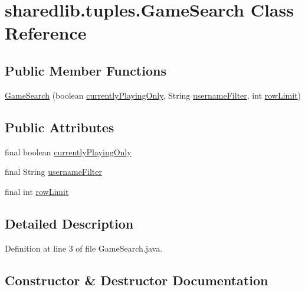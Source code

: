 \hypertarget{classsharedlib_1_1tuples_1_1_game_search}{}\section{sharedlib.\+tuples.\+Game\+Search Class Reference}
\label{classsharedlib_1_1tuples_1_1_game_search}
\subsection*{Public Member Functions}
\begin{DoxyCompactItemize}
\item 
\hyperlink{classsharedlib_1_1tuples_1_1_game_search_a2f14b544e708acb6e48873d770911c63}{Game\+Search} (boolean \hyperlink{classsharedlib_1_1tuples_1_1_game_search_a88c70bcff0388dd9e9704a60980049b8}{currently\+Playing\+Only}, String \hyperlink{classsharedlib_1_1tuples_1_1_game_search_a9519b13f2ff02e7e7d4d25fc6cf0f89d}{username\+Filter}, int \hyperlink{classsharedlib_1_1tuples_1_1_game_search_a4904f3bb0a4b76505839c5f769746b37}{row\+Limit})
\end{DoxyCompactItemize}
\subsection*{Public Attributes}
\begin{DoxyCompactItemize}
\item 
final boolean \hyperlink{classsharedlib_1_1tuples_1_1_game_search_a88c70bcff0388dd9e9704a60980049b8}{currently\+Playing\+Only}
\item 
final String \hyperlink{classsharedlib_1_1tuples_1_1_game_search_a9519b13f2ff02e7e7d4d25fc6cf0f89d}{username\+Filter}
\item 
final int \hyperlink{classsharedlib_1_1tuples_1_1_game_search_a4904f3bb0a4b76505839c5f769746b37}{row\+Limit}
\end{DoxyCompactItemize}


\subsection{Detailed Description}


Definition at line 3 of file Game\+Search.\+java.



\subsection{Constructor \& Destructor Documentation}
\hypertarget{classsharedlib_1_1tuples_1_1_game_search_a2f14b544e708acb6e48873d770911c63}{}\label{classsharedlib_1_1tuples_1_1_game_search_a2f14b544e708acb6e48873d770911c63} 

